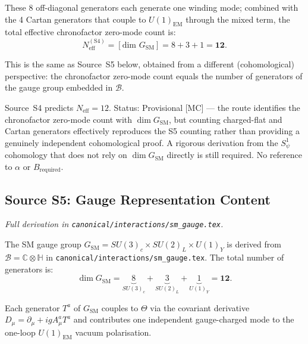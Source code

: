 \documentclass[12pt,a4paper]{article}
\theoremstyle{definition}
\theoremstyle{remark}
\begin{document}
These 8 off-diagonal generators each generate one winding mode; combined with
the 4 Cartan generators that couple to $U(1)_\mathrm{EM}$ through the mixed
term, the total effective chronofactor zero-mode count is:
\begin{equation}
  N_{\mathrm{eff}}^{(\mathrm{S4})}
  = [\text{dim } G_{\mathrm{SM}}]
  = 8 + 3 + 1
  = \mathbf{12}.
  \label{eq:S4}
\end{equation}

This is the same as Source~S5 below, obtained from a different (cohomological)
perspective: the chronofactor zero-mode count equals the number of generators of
the gauge group embedded in $\mathcal{B}$.

\begin{resultbox}
  Source~S4 predicts $N_{\mathrm{eff}} = 12$.
  Status: Provisional [MC] — the route identifies the chronofactor zero-mode
  count with $\dim G_{\mathrm{SM}}$, but counting charged-flat and Cartan
  generators effectively reproduces the S5 counting rather than providing a
  genuinely independent cohomological proof.  A rigorous derivation from the
  $S^1_\psi$ cohomology that does not rely on $\dim G_{\mathrm{SM}}$ directly
  is still required.
  No reference to $\alpha$ or $B_{\mathrm{required}}$.
\end{resultbox}

\subsection{Source S5: Gauge Representation Content}
\label{ssec:S5}

\textit{Full derivation in \texttt{canonical/interactions/sm\_gauge.tex}.}

\medskip
The SM gauge group $G_{\mathrm{SM}} = SU(3)_c\times SU(2)_L\times U(1)_Y$ is
derived from $\mathcal{B} = \mathbb{C}\otimes\mathbb{H}$ in
\texttt{canonical/interactions/sm\_gauge.tex}.  The total number of generators is:
\begin{equation}
  \dim G_{\mathrm{SM}}
  = \underbrace{8}_{SU(3)_c}
  + \underbrace{3}_{SU(2)_L}
  + \underbrace{1}_{U(1)_Y}
  = \mathbf{12}.
  \label{eq:S5}
\end{equation}

Each generator $T^a$ of $G_{\mathrm{SM}}$ couples to $\Theta$ via the covariant
derivative $D_\mu = \partial_\mu + ig A^a_\mu T^a$ and contributes one
independent gauge-charged mode to the one-loop $U(1)_{\mathrm{EM}}$ vacuum
polarisation.
\end{document}
